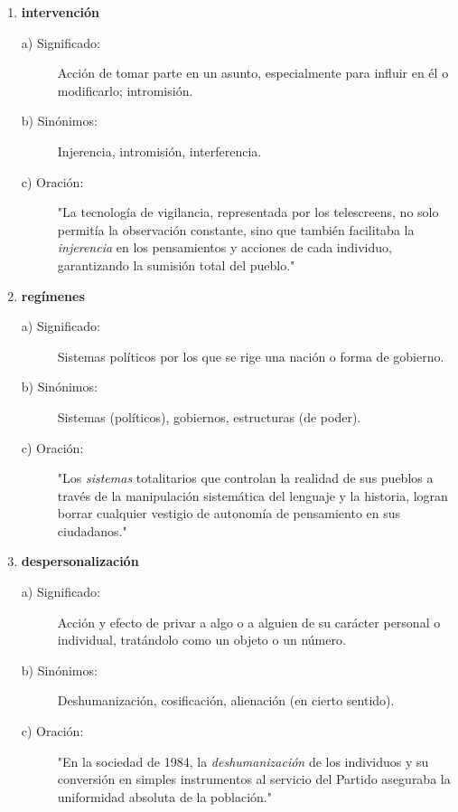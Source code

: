 \documentclass[11pt, a4paper]{article}
\begin{document}
\begin{enumerate}
    \item \textbf{intervención}
    \begin{description}
        \item[a) Significado:] Acción de tomar parte en un asunto, especialmente para influir en él o modificarlo; intromisión.
        \item[b) Sinónimos:] Injerencia, intromisión, interferencia.
        \item[c) Oración:] "La tecnología de vigilancia, representada por los telescreens, no solo permitía la observación constante, sino que también facilitaba la \textit{injerencia} en los pensamientos y acciones de cada individuo, garantizando la sumisión total del pueblo."
    \end{description}

    \item \textbf{regímenes} %
    \begin{description}
        \item[a) Significado:] Sistemas políticos por los que se rige una nación o forma de gobierno.
        \item[b) Sinónimos:] Sistemas (políticos), gobiernos, estructuras (de poder).
        \item[c) Oración:] "Los \textit{sistemas} totalitarios que controlan la realidad de sus pueblos a través de la manipulación sistemática del lenguaje y la historia, logran borrar cualquier vestigio de autonomía de pensamiento en sus ciudadanos."
    \end{description}

    \item \textbf{despersonalización}
    \begin{description}
        \item[a) Significado:] Acción y efecto de privar a algo o a alguien de su carácter personal o individual, tratándolo como un objeto o un número.
        \item[b) Sinónimos:] Deshumanización, cosificación, alienación (en cierto sentido).
        \item[c) Oración:] "En la sociedad de 1984, la \textit{deshumanización} de los individuos y su conversión en simples instrumentos al servicio del Partido aseguraba la uniformidad absoluta de la población."
    \end{description}


\end{enumerate}
\end{document}
